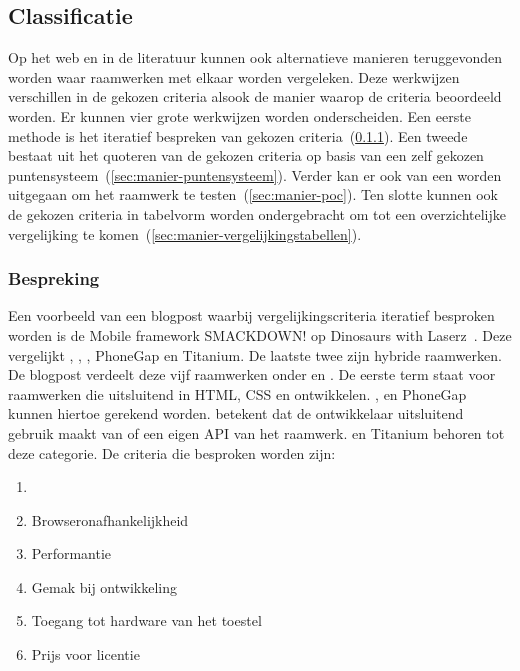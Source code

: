 \subsection{Classificatie}
\label{sec:vergelijken-classificatie}
Op het web en in de literatuur kunnen ook alternatieve manieren teruggevonden worden waar raamwerken met elkaar worden vergeleken.  
Deze werkwijzen verschillen in de gekozen criteria alsook de manier waarop de criteria beoordeeld worden.
Er kunnen vier grote werkwijzen worden onderscheiden.
Een eerste methode is het iteratief bespreken van gekozen criteria~(\ref{sec:manier-bespreken}).
Een tweede bestaat uit het quoteren van de gekozen criteria op basis van een zelf gekozen puntensysteem~(\ref{sec:manier-puntensysteem}).
Verder kan er ook van een  worden uitgegaan om het raamwerk te testen~(\ref{sec:manier-poc}).
Ten slotte kunnen ook de gekozen criteria in tabelvorm worden ondergebracht om tot een overzichtelijke vergelijking te komen~(\ref{sec:manier-vergelijkingstabellen}).

\subsubsection{Bespreking}
\label{sec:manier-bespreken}
Een voorbeeld van een blogpost waarbij vergelijkingscriteria iteratief besproken worden is de Mobile framework SMACKDOWN! op Dinosaurs with Laserz~\cite{Rozynski2011}.
Deze vergelijkt \jqt{},  \jqm{},  \st{},  PhoneGap en Titanium.  
De laatste twee zijn hybride raamwerken.
De blogpost verdeelt deze vijf raamwerken onder  en .
De eerste term staat voor raamwerken die uitsluitend in HTML, CSS en \js{} ontwikkelen. 
\jqt{},  \jqm{} en PhoneGap kunnen hiertoe gerekend worden.
 betekent dat de ontwikkelaar uitsluitend gebruik maakt van \js{} of een eigen API van het raamwerk.
\st{} en Titanium behoren tot deze categorie.
De criteria die besproken worden zijn:
\begin{enumerate}
 \item {}
 \item Browseronafhankelijkheid
 \item Performantie
 \item Gemak bij ontwikkeling
 \item Toegang tot hardware van het toestel
 \item Prijs voor licentie
\end{enumerate}

